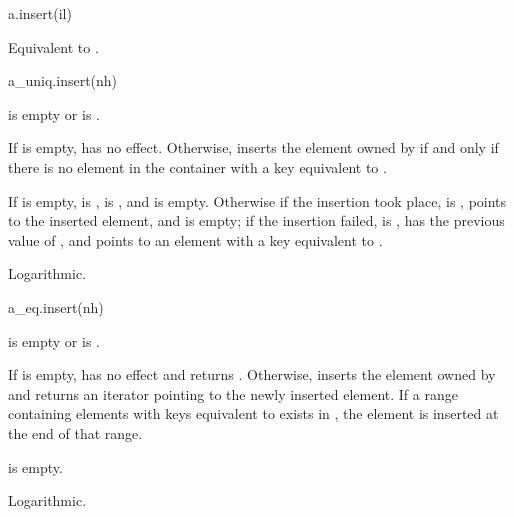 %
\begin{itemdecl}
a.insert(il)
\end{itemdecl}

\begin{itemdescr}
\pnum
\effects
Equivalent to .
\end{itemdescr}

%
\begin{itemdecl}
a_uniq.insert(nh)
\end{itemdecl}

\begin{itemdescr}
\pnum
\result
{}

\pnum
\expects
{} is empty or
 is .

\pnum
\effects
If  is empty, has no effect.
Otherwise, inserts the element owned by  if and only if
there is no element in the container with a key equivalent to .

\pnum
\returns
If  is empty,  is ,
 is , and  is empty.
Otherwise if the insertion took place,  is ,
 points to the inserted element, and  is empty;
if the insertion failed,  is ,
 has the previous value of , and
 points to an element with a key equivalent to .

\pnum
\complexity
Logarithmic.
\end{itemdescr}

%
\begin{itemdecl}
a_eq.insert(nh)
\end{itemdecl}

\begin{itemdescr}
\pnum
\result
{}

\pnum
\expects
{} is empty or
 is .

\pnum
\effects
If  is empty, has no effect and returns .
Otherwise, inserts the element owned by  and
returns an iterator pointing to the newly inserted element.
If a range containing elements with keys equivalent to 
exists in ,
the element is inserted at the end of that range.

\pnum
\ensures
{} is empty.

\pnum
\complexity
Logarithmic.
\end{itemdescr}

